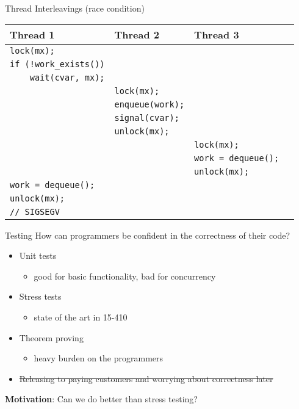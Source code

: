 \documentclass[xcolor=dvipsnames]{beamer}
\begin{document}
\begin{frame}{Thread Interleavings (race condition)}
	\begin{center}
		\begin{tabular}{|l|l|l|}
			\hline
			\cellcolor{thread1} {\bf Thread 1} & \cellcolor{thread2} {\bf Thread 2} & \cellcolor{thread3} {\bf Thread 3} \\
			\hline
			\small \texttt{lock(mx);} & & \\
			\small \texttt{if~(!work\_exists())} & & \\
			\small \texttt{~~~~wait(cvar,~mx);} & & \\
			
			& \small \texttt{lock(mx);} & \\
			& \small \texttt{enqueue(work);} & \\
			& \small \texttt{signal(cvar);} & \\
			& \small \texttt{unlock(mx);} & \\
			
			& & \small \texttt{lock(mx);} \\
			& & \small \texttt{work~=~dequeue();~~} \\
			& & \small \texttt{unlock(mx);} \\

			\small \texttt{work~=~dequeue();} & & \\
			\small \texttt{unlock(mx);} & & \\
			\small \texttt{//~SIGSEGV} {\large \frownie}& & \\
			\hline
		\end{tabular}
	\end{center}
\end{frame}


\begin{frame}{Testing}
	How can programmers be confident in the correctness of their code?
	\begin{itemize}
		\item Unit tests
		\begin{itemize}
			\item good for basic functionality, bad for concurrency
		\end{itemize}
		\item Stress tests
		\begin{itemize}
			\item state of the art in 15-410
		\end{itemize}
		\item Theorem proving
		\begin{itemize}
			\item heavy burden on the programmers
		\end{itemize}
		\item \sout{Releasing to paying customers and worrying about correctness later}
	\end{itemize}
	\linegap

	{\bf Motivation}: Can we do better than stress testing?
\end{frame}
\end{document}
